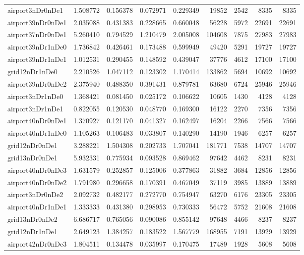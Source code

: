 \begin{longtable}{|l|r|r|r|r|r|r|r|r|}
airport3nDr0nDe1 & 1.508772 & 0.156378 & 0.072971 & 0.229349 & 19852 & 2542 & 8335 & 8335 \\
airport39nDr0nDe1 & 2.035088 & 0.431383 & 0.228665 & 0.660048 & 56228 & 5972 & 22691 & 22691 \\
airport37nDr0nDe1 & 5.260410 & 0.794529 & 1.210479 & 2.005008 & 104608 & 7875 & 27983 & 27983 \\
airport39nDr1nDe0 & 1.736842 & 0.426461 & 0.173488 & 0.599949 & 49420 & 5291 & 19727 & 19727 \\
airport39nDr1nDe1 & 1.012531 & 0.290455 & 0.148592 & 0.439047 & 37776 & 4612 & 17100 & 17100 \\
grid12nDr1nDe0 & 2.210526 & 1.047112 & 0.123302 & 1.170414 & 133862 & 5694 & 10692 & 10692 \\
airport39nDr0nDe2 & 2.375940 & 0.488350 & 0.391431 & 0.879781 & 63680 & 6724 & 25946 & 25946 \\
airport3nDr1nDe0 & 1.368421 & 0.081450 & 0.025172 & 0.106622 & 10605 & 1430 & 4128 & 4128 \\
airport3nDr1nDe1 & 0.822055 & 0.120530 & 0.048770 & 0.169300 & 16122 & 2270 & 7356 & 7356 \\
airport40nDr0nDe1 & 1.370927 & 0.121170 & 0.041327 & 0.162497 & 16204 & 2266 & 7566 & 7566 \\
airport40nDr1nDe0 & 1.105263 & 0.106483 & 0.033807 & 0.140290 & 14190 & 1946 & 6257 & 6257 \\
grid12nDr0nDe1 & 3.288221 & 1.504308 & 0.202733 & 1.707041 & 181771 & 7538 & 14707 & 14707 \\
grid13nDr0nDe1 & 5.932331 & 0.775934 & 0.093528 & 0.869462 & 97642 & 4462 & 8231 & 8231 \\
airport40nDr0nDe3 & 1.631579 & 0.252857 & 0.125006 & 0.377863 & 31882 & 3684 & 12856 & 12856 \\
airport40nDr0nDe2 & 1.791980 & 0.296658 & 0.170391 & 0.467049 & 37119 & 3985 & 13889 & 13889 \\
airport3nDr0nDe2 & 2.092732 & 0.482177 & 0.272770 & 0.754947 & 63270 & 6176 & 23305 & 23305 \\
airport40nDr1nDe1 & 1.333333 & 0.431380 & 0.298953 & 0.730333 & 56472 & 5752 & 21608 & 21608 \\
grid13nDr0nDe2 & 6.686717 & 0.765056 & 0.090086 & 0.855142 & 97648 & 4466 & 8237 & 8237 \\
grid12nDr1nDe1 & 2.649123 & 1.384257 & 0.183522 & 1.567779 & 168955 & 7191 & 13929 & 13929 \\
airport42nDr0nDe3 & 1.804511 & 0.134478 & 0.035997 & 0.170475 & 17489 & 1928 & 5608 & 5608 \\

\end{longtable}
